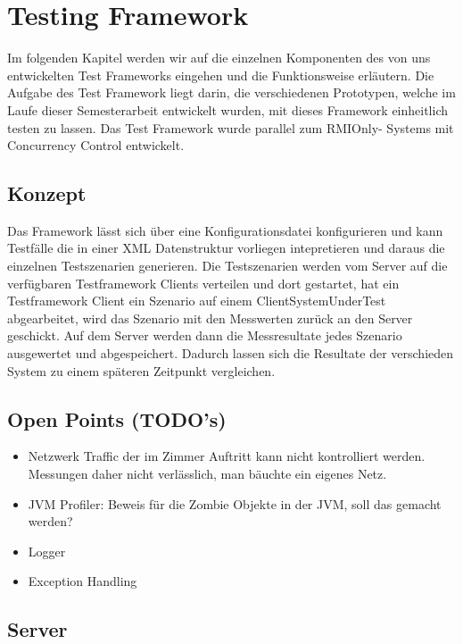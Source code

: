 \section{Testing Framework}
\label{sec:testing Framework}
Im folgenden Kapitel werden wir auf die einzelnen Komponenten des von uns entwickelten Test Frameworks eingehen und die Funktionsweise erläutern. Die Aufgabe des Test Framework liegt darin, die verschiedenen Prototypen, welche im Laufe dieser Semesterarbeit entwickelt wurden, mit dieses Framework einheitlich testen zu lassen. Das Test Framework wurde parallel zum RMIOnly- Systems mit Concurrency Control entwickelt.

\subsection{Konzept}
Das Framework lässt sich über eine Konfigurationsdatei konfigurieren und kann Testfälle die in einer XML Datenstruktur vorliegen intepretieren und daraus die einzelnen Testszenarien generieren. Die Testszenarien werden vom Server auf die verfügbaren Testframework Clients verteilen und dort gestartet, hat ein Testframework Client ein Szenario auf einem ClientSystemUnderTest abgearbeitet, wird das Szenario mit den Messwerten zurück an den Server geschickt. Auf dem Server werden dann die Messresultate jedes Szenario ausgewertet und abgespeichert. Dadurch lassen sich die Resultate der verschieden System zu einem späteren Zeitpunkt vergleichen.

\subsection{Open Points (TODO's)}
\begin{itemize}	
\item Netzwerk Traffic der im Zimmer Auftritt kann nicht kontrolliert werden. Messungen daher nicht verlässlich, man bäuchte ein eigenes Netz.
\item JVM Profiler: Beweis für die Zombie Objekte in der JVM, soll das gemacht werden?
\item Logger
\item Exception Handling
\end{itemize}



\subsection{Server}
\label{sec:test-FW Server}
